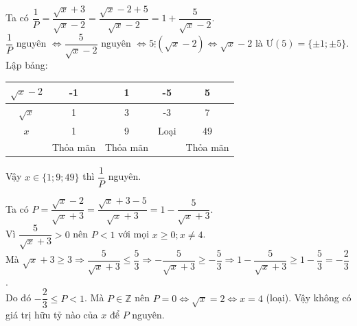 \documentclass[12pt]{article}
\begin{document}
\begin{bt}
{\begin{cacy}
\item Ta có $\dfrac{1}{P} = \dfrac{\sqrt{x}+3}{\sqrt{x}-2} = \dfrac{\sqrt{x}-2+5}{\sqrt{x}-2} = 1 + \dfrac{5}{\sqrt{x}-2}$.\\
$\dfrac{1}{P}$ nguyên $\Leftrightarrow \dfrac{5}{\sqrt{x}-2}$ nguyên $\Leftrightarrow 5 \vdots \left(\sqrt{x}-2\right) \Leftrightarrow \sqrt{x}-2$ là $\text{Ư}(5) = \{\pm 1; \pm 5\}$.\\
Lập bảng:
\begin{center}
\begin{tabular}{|c|c|c|c|c|}
\hline
$\sqrt{x}-2$ & -1 & 1 & -5 & 5 \\ \hline
$\sqrt{x}$ & 1 & 3 & -3 & 7 \\ \hline
$x$ & 1 & 9 & Loại & 49 \\ \hline
& Thỏa mãn & Thỏa mãn & & Thỏa mãn \\ \hline
\end{tabular}
\end{center}
Vậy $x \in \{1; 9; 49\}$ thì $\dfrac{1}{P}$ nguyên.

\item Ta có $P = \dfrac{\sqrt{x}-2}{\sqrt{x}+3} = \dfrac{\sqrt{x}+3-5}{\sqrt{x}+3} = 1 - \dfrac{5}{\sqrt{x}+3}$.\\
Vì $\dfrac{5}{\sqrt{x}+3} > 0$ nên $P < 1$ với mọi $x \ge 0; x \ne 4$.\\
Mà $\sqrt{x}+3 \ge 3 \Rightarrow \dfrac{5}{\sqrt{x}+3} \le \dfrac{5}{3} \Rightarrow -\dfrac{5}{\sqrt{x}+3} \ge -\dfrac{5}{3} \Rightarrow 1 - \dfrac{5}{\sqrt{x}+3} \ge 1 - \dfrac{5}{3} = -\dfrac{2}{3}$.\\
Do đó $-\dfrac{2}{3} \le P < 1$. Mà $P \in \mathbb{Z}$ nên $P = 0 \Leftrightarrow \sqrt{x} = 2 \Leftrightarrow x = 4$ (loại). Vậy không có giá trị hữu tỷ nào của $x$ để $P$ nguyên.
\end{cacy}
}
\end{bt}
\end{document}
